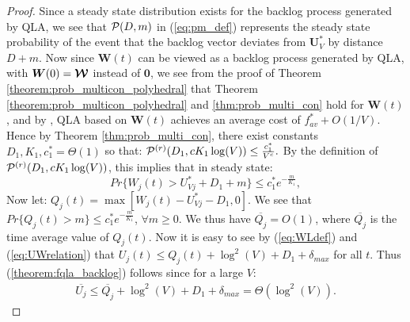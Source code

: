 \documentclass[journal]{IEEEtran}
\newcommand{\prob}{Pr}
\newcommand{\bv}[1]{{\boldsymbol{#1} }}
\newcommand{\script}[1]{{{\cal{#1} }}}
\begin{document}
\begin{proof} Since a steady state distribution exists for the backlog process generated by QLA, we see that $\script{P}(D, m)$ in (\ref{eq:pm_def}) represents the steady state probability of the event that the backlog vector deviates from $\bv{U}^*_V$ by distance $D+m$. Now since $\bv{W}(t)$ can be viewed as a backlog process generated by QLA, with $\bv{W}(0)=\bv{\script{W}}$ instead of $\bv{0}$, we see from the proof of Theorem \ref{theorem:prob_multicon_polyhedral} that Theorem \ref{theorem:prob_multicon_polyhedral} and \ref{thm:prob_multi_con} hold for $\bv{W}(t)$, and by \cite{neelynowbook}, QLA based on $\bv{W}(t)$ achieves an average cost of $f^*_{av}+O(1/V)$. Hence by Theorem \ref{thm:prob_multi_con}, there exist constants $D_1, K_1, c_1^*=\Theta(1)$ so that:
$\script{P}^{(r)}(D_1, cK_1\log(V)) \leq \frac{c_1^*}{V^c}.$
By the definition of $\script{P}^{(r)}(D_1, cK_1\log(V))$, this implies that in steady state:
\[\prob\{W_j(t)>U^*_{Vj}+D_1+m\}\leq c_1^*e^{-\frac{m}{K_1}},\]
Now let: 
$Q_j(t)=\max[W_j(t)-U^*_{Vj}-D_1,0]$. We see that $\prob\{Q_j(t)>m\}\leq c_1^*e^{-\frac{m}{K_1}}$, $\forall m\geq0$.  We thus have $\overline{Q_j}= O(1)$, where $\overline{Q_j}$ is the time average value of $Q_j(t)$. Now it is easy to see by (\ref{eq:WLdef}) and (\ref{eq:UWrelation}) that $U_j(t)\leq Q_j(t)+\log^2(V)+D_1+\delta_{max}$ for all $t$. Thus (\ref{theorem:fqla_backlog}) follows since for a large $V$:
\begin{eqnarray*}
\overline{U_j}\leq \overline{Q_j}+\log^2(V)+D_1+\delta_{max} =\Theta(\log^2(V)).
\end{eqnarray*}


\end{proof}
\end{document}
